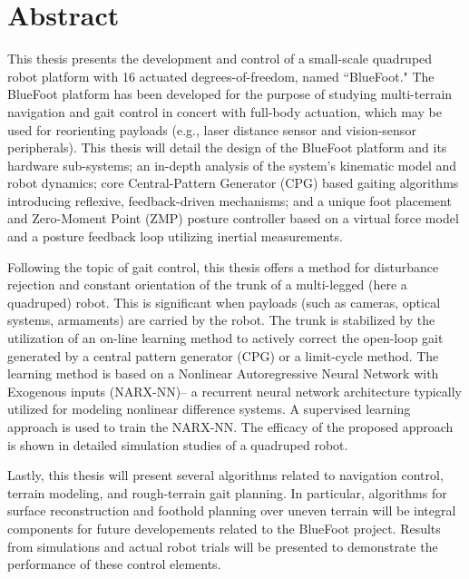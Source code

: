 \section*{Abstract}

	This thesis presents the development and control of a small-scale quadruped robot platform with 16 actuated degrees-of-freedom, named ``BlueFoot." The BlueFoot platform has been developed for the purpose of studying multi-terrain navigation and gait control in concert with full-body actuation, which may be used for reorienting payloads (e.g., laser distance sensor and vision-sensor peripherals). This thesis will detail the design of the BlueFoot platform and its hardware sub-systems; an in-depth analysis of the system's kinematic model and robot dynamics; core Central-Pattern Generator (CPG) based gaiting algorithms introducing reflexive, feedback-driven mechanisms; and a unique foot placement and Zero-Moment Point (ZMP) posture controller based on a virtual force model and a posture feedback loop utilizing inertial measurements. %

	Following the topic of gait control, this thesis offers a method for disturbance rejection and constant orientation of the trunk of a multi-legged (here a quadruped) robot. This is significant when payloads (such as cameras, optical systems, armaments) are carried by the robot.  The trunk is stabilized by the utilization of an on-line learning method to actively correct the open-loop gait generated by a central pattern generator (CPG) or a limit-cycle method. The learning method is based on a Nonlinear Autoregressive Neural Network with Exogenous inputs (NARX-NN)-- a recurrent neural network architecture typically utilized for modeling nonlinear difference systems. A supervised learning approach is used to train the NARX-NN. 
	The efficacy of the proposed approach is shown in detailed simulation studies of a quadruped robot. 

	Lastly, this thesis will present several algorithms related to navigation control, terrain modeling, and rough-terrain gait planning. In particular, algorithms for surface reconstruction and foothold planning over uneven terrain will be integral components for future developements related to the BlueFoot project. Results from simulations and actual robot trials will be presented to demonstrate the performance of these control elements. 